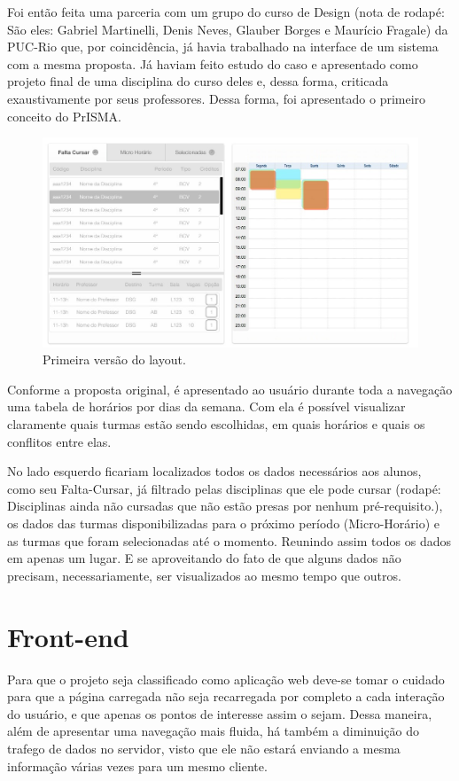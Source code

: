 \documentclass[graduacao,brazil]{ThesisPUC}
\begin{document}
Foi então feita uma parceria com um grupo do curso de Design (nota de rodapé: São eles: Gabriel Martinelli, Denis Neves, Glauber Borges e Maurício Fragale) da PUC-Rio que, por coincidência, já havia trabalhado na interface de um sistema com a mesma proposta. Já haviam feito estudo do caso e apresentado como projeto final de uma disciplina do curso deles e, dessa forma, criticada exaustivamente por seus professores. Dessa forma, foi apresentado o primeiro conceito do PrISMA.

\begin{figure}[H]
    \centering
    \includegraphics[width=\linewidth]{img/prisma.jpg}
    \caption{Primeira versão do layout.}
\end{figure}

Conforme a proposta original, é apresentado ao usuário durante toda a navegação uma tabela de horários por dias da semana. Com ela é possível visualizar claramente quais turmas estão sendo escolhidas, em quais horários e quais os conflitos entre elas.

No lado esquerdo ficariam localizados todos os dados necessários aos alunos, como seu Falta-Cursar, já filtrado pelas disciplinas que ele pode cursar (rodapé: Disciplinas ainda não cursadas que não estão presas por nenhum pré-requisito.), os dados das turmas disponibilizadas para o próximo período (Micro-Horário) e as turmas que foram selecionadas até o momento. Reunindo assim todos os dados em apenas um lugar. E se aproveitando do fato de que alguns dados não precisam, necessariamente, ser visualizados ao mesmo tempo que outros.

\section{Front-end}

Para que o projeto seja classificado como aplicação web deve-se tomar o cuidado para que a página carregada não seja recarregada por completo a cada interação do usuário, e que apenas os pontos de interesse assim o sejam. Dessa maneira, além de apresentar uma navegação mais fluida, há também a diminuição do trafego de dados no servidor, visto que ele não estará enviando a mesma informação várias vezes para um mesmo cliente.
\end{document}
